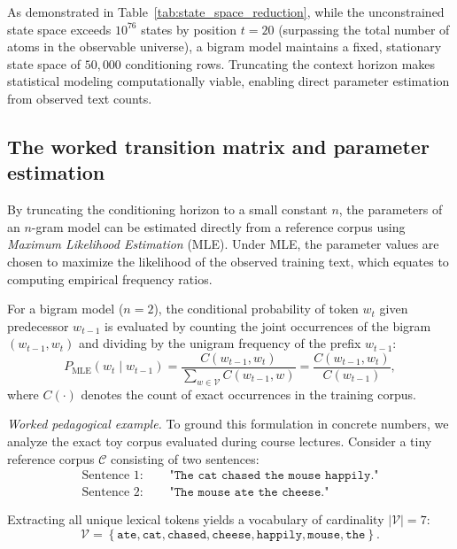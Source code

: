\documentclass[../../../main.tex]{subfiles}
\begin{document}
As demonstrated in Table~\ref{tab:state_space_reduction}, while the unconstrained state space exceeds $10^{76}$ states by position $t=20$ (surpassing the total number of atoms in the observable universe), a bigram model maintains a fixed, stationary state space of $50{,}000$ conditioning rows. Truncating the context horizon makes statistical modeling computationally viable, enabling direct parameter estimation from observed text counts.

\subsection{The worked transition matrix and parameter estimation}
\label{subsec:worked_transition_matrix}

By truncating the conditioning horizon to a small constant $n$, the parameters of an $n$-gram model can be estimated directly from a reference corpus using \textit{Maximum Likelihood Estimation} (MLE). Under MLE, the parameter values are chosen to maximize the likelihood of the observed training text, which equates to computing empirical frequency ratios.

For a bigram model ($n=2$), the conditional probability of token $w_t$ given predecessor $w_{t-1}$ is evaluated by counting the joint occurrences of the bigram $(w_{t-1}, w_t)$ and dividing by the unigram frequency of the prefix $w_{t-1}$:
\begin{equation}
P_{\text{MLE}}\left(w_t \mid w_{t-1}\right) = \frac{C\left(w_{t-1}, w_t\right)}{\sum_{w \in \mathcal{V}} C\left(w_{t-1}, w\right)} = \frac{C\left(w_{t-1}, w_t\right)}{C\left(w_{t-1}\right)},
\label{eq:mle_bigram}
\end{equation}
where $C(\cdot)$ denotes the count of exact occurrences in the training corpus.

\textit{Worked pedagogical example.} To ground this formulation in concrete numbers, we analyze the exact toy corpus evaluated during course lectures. Consider a tiny reference corpus $\mathcal{C}$ consisting of two sentences:
\begin{align}
\text{Sentence 1: } & \quad \texttt{"The cat chased the mouse happily."} \\
\text{Sentence 2: } & \quad \texttt{"The mouse ate the cheese."}
\end{align}

Extracting all unique lexical tokens yields a vocabulary of cardinality $|\mathcal{V}| = 7$:
\begin{equation}
\mathcal{V} = \left\{\texttt{ate}, \texttt{cat}, \texttt{chased}, \texttt{cheese}, \texttt{happily}, \texttt{mouse}, \texttt{the}\right\}.
\end{equation}
\end{document}
